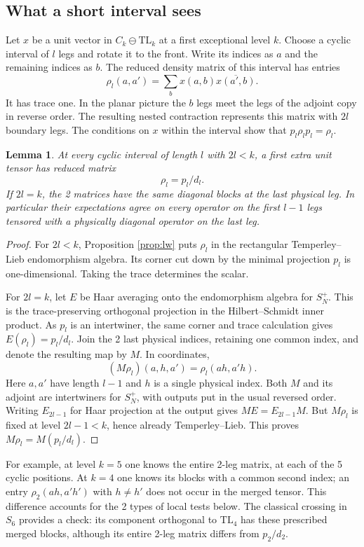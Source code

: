 \documentclass[11pt,a4paper]{amsart}
\newtheorem{lemma}[theorem]{Lemma}
\newcommand{\TL}{\mathrm{TL}}
\begin{document}
\subsection{What a short interval sees}
Let $x$ be a unit vector in $C_k\ominus\TL_k$ at a first exceptional level $k$. Choose a cyclic interval of $l$ legs and rotate it to the front. Write its indices as $a$ and the remaining indices as $b$. The reduced density matrix of this interval has entries
\[
 \rho_l(a,a')=\sum_b x(a,b)\overline{x(a',b)} .
\]
It has trace one. In the planar picture the $b$ legs meet the legs of the adjoint copy in reverse order. The resulting nested contraction represents this matrix with $2l$ boundary legs. The conditions on $x$ within the interval show that $p_l\rho_lp_l=\rho_l$.

\begin{lemma}\label{lem:marginal}
At every cyclic interval of length $l$ with $2l<k$, a first extra unit tensor has reduced matrix
\[
 \rho_l=p_l/d_l .
\]
If $2l=k$, the 2 matrices have the same diagonal blocks at the last physical leg. In particular their expectations agree on every operator on the first $l-1$ legs tensored with a physically diagonal operator on the last leg.
\end{lemma}
\begin{proof}
For $2l<k$, Proposition \ref{prop:lw} puts $\rho_l$ in the rectangular Temperley--Lieb endomorphism algebra. Its corner cut down by the minimal projection $p_l$ is one-dimensional. Taking the trace determines the scalar.

For $2l=k$, let $E$ be Haar averaging onto the endomorphism algebra for $S_N^+$. This is the trace-preserving orthogonal projection in the Hilbert--Schmidt inner product. As $p_l$ is an intertwiner, the same corner and trace calculation gives $E(\rho_l)=p_l/d_l$. Join the 2 last physical indices, retaining one common index, and denote the resulting map by $M$. In coordinates,
\[
 (M\rho_l)(a,h,a')=\rho_l(ah,a'h).
\]
Here $a,a'$ have length $l-1$ and $h$ is a single physical index. Both $M$ and its adjoint are intertwiners for $S_N^+$, with outputs put in the usual reversed order. Writing $E_{2l-1}$ for Haar projection at the output gives $ME=E_{2l-1}M$. But $M\rho_l$ is fixed at level $2l-1<k$, hence already Temperley--Lieb. This proves $M\rho_l=M(p_l/d_l)$.
\end{proof}

For example, at level $k=5$ one knows the entire 2-leg matrix, at each of the 5 cyclic positions. At $k=4$ one knows its blocks with a common second index; an entry $\rho_2(ah,a'h')$ with $h\neq h'$ does not occur in the merged tensor. This difference accounts for the 2 types of local tests below. The classical crossing in $S_6$ provides a check: its component orthogonal to $\TL_4$ has these prescribed merged blocks, although its entire 2-leg matrix differs from $p_2/d_2$.
\end{document}
